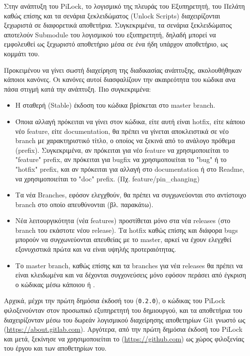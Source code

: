 		Στην ανάπτυξη του PiLock, το λογισμικό της πλευράς του Εξυπηρετητή, του Πελάτη καθώς επίσης και τα σενάρια ξεκλειδώματος (Unlock Scripts) διαχειρίζονται ξεχωριστά σε διαφορετικά αποθετήρια. Συγκεκριμένα, τα σενάρια ξεκλειδώματος αποτελούν Submodule του λογισμικού του εξυπηρετητή, δηλαδή μπορεί να εμφολευθεί ως ξεχωριστό αποθετήριο μέσα σε ένα ήδη υπάρχον αποθετήριο, ως κομμάτι του.

		Προκειμένου να γίνει σωστή διαχείρηση της διαδικασίας ανάπτυξης, ακολουθήθηκαν κάποιοι κανόνες. Οι κανόνες αυτοί διασφαλίζουν την ακαιρεότητα του κώδικα ανα πάσα στιγμή κατά την ανάπτυξη. Πιο συγκεκριμένα:

		\begin{itemize}
			\item Η σταθερή (Stable) έκδοση του κώδικα βρίσκεται στο master branch.
			\item Όποια αλλαγή πρόκειται να γίνει στον κώδικα, είτε αυτή είναι hotfix, είτε κάποιο νέο feature, είτε documentation, θα πρέπει να γίνεται αποκλειστικά σε νέο branch με χαρακτηριστικό τίτλο, ο οποίος να ξεκινά από το ανάλογο πρόθεμα (prefix). Συγκεκριμένα, αν πρόκειται για νέο feature να χρησιμοποιείται το "feature" prefix, αν πρόκειται για bugfix να χρησιμοποιείται το "bug" ή το "hotfix" prefix, και αν πρόκειται για αλλαγή στο documentation ή στο Readme, να χρησιμοποιείται το "doc" prefix. (Πχ. feature/pin\_changing)
			\item Τα νέα Branches, εφόσον ελεγχθούν, θα πρέπει να συγχωνεύονται στο αντίστοιχο branch στο οποίο απευθύνονται (βλ. παρακάτω).
			\item Νέα λειτουργικότητα (νέα features) προστίθεται μόνο στα νέα releases (στο branch του εκάστοτε νέου release). Τα hotfix καθώς επίσης και διάφορα bugs μπορούν να συγχωνεύονται απευθείας με το master, αρκεί να έχουν ελεγχθεί εξονυχιστικά πρώτα και να είναι υψηλής προτεραιότητας.
			\item Το master branch, καθώς επίσης και τα branches για νέα releases θα πρέπει να είναι κλειδωμένα και να δέχονται συγχονεύσεις μόνο εφόσον περάσει από έγκριση ο κώδικας μέσω κάποιου  ή .
		\end{itemize} 

		Αρχικά, μέχρι την πρώτη δημόσια έκδοσή του (\verb|0.2.0|), ο κώδικας του PiLock φιλοξενούνταν στον προσωπικό εξυπηρετητή του δημιουργού, και τα αποθετήρια του διαχειρίζονταν μέσω του δωρεάν λογισμικού διαχείρησης αποθετηρίων Git γνωστό ως  (\url{https://about.gitlab.com}). Αργότερα, από την πρώτη δημόσια έκδοσή του PiLock και μετά, ξεκίνησε να χρησιμοποιείται το  (\url{https://github.com}) ως χώρος φιλοξενίας του έργου και των αποθετηρίων του.

